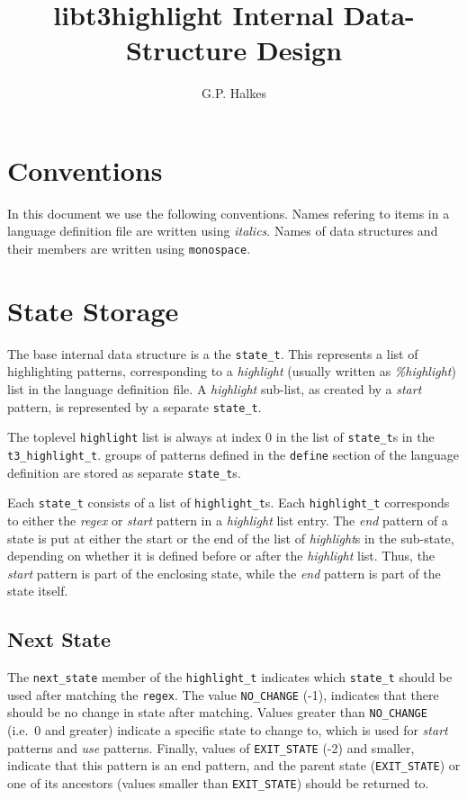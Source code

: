 \documentclass[a4paper]{article}
\title{libt3highlight Internal Data-Structure Design}
\author{G.P. Halkes}
\date{}
\newcommand{\state}{{\tt state_t}\xspace}
\newcommand{\highlight}{{\tt highlight_t}\xspace}
\begin{document}
\maketitle

\begin{multicols}{2}
\section{Conventions}
In this document we use the following conventions. Names refering to items in a
language definition file are written using {\it italics}. Names of data
structures and their members are written using {\tt monospace}.

\section{State Storage}
The base internal data structure is a the \state. This
represents a list of highlighting patterns, corresponding to a
{\it highlight} (usually written as {\it \%highlight}) list in the
language definition file. A {\it highlight} sub-list, as created by a
{\it start} pattern, is represented by a separate \state.

The toplevel {\tt highlight} list is always at index 0 in the list of \state{}s
in the {\tt t3_highlight_t}. groups of patterns defined in the {\tt define}
section of the language definition are stored as separate \state{}s.

Each \state consists of a list of \highlight{}s. Each \highlight corresponds to
either the {\it regex} or {\it start} pattern in a {\it highlight} list entry.
The {\it end} pattern of a state is put at either the start or the end of the
list of {\it highlight}s in the sub-state, depending on whether it is defined
before or after the {\it highlight} list. Thus, the {\it start} pattern is part
of the enclosing state, while the {\it end} pattern is part of the state itself.

\subsection{Next State}
The {\tt next_state} member of the \highlight indicates which \state should be
used after matching the {\tt regex}. The value {\tt NO_CHANGE} (-1), indicates
that there should be no change in state after matching. Values greater than
{\tt NO_CHANGE} (i.e.\ 0 and greater) indicate a specific state to change to,
which is used for {\it start} patterns and {\it use} patterns. Finally, values
of {\tt EXIT_STATE} (-2) and smaller, indicate that this pattern is an end
pattern, and the parent state ({\tt EXIT_STATE}) or one of its ancestors
(values smaller than {\tt EXIT_STATE}) should be returned to.


\end{multicols}
\end{document}
